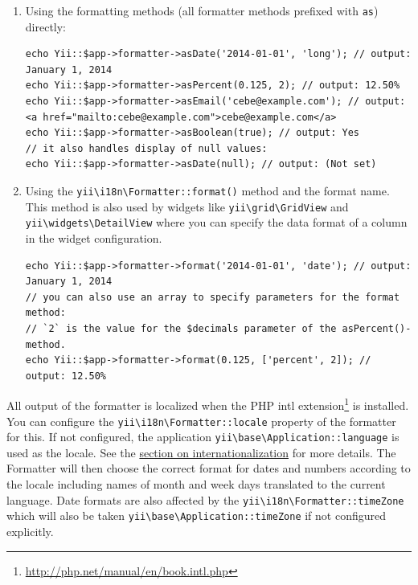 \begin{enumerate}
\item Using the formatting methods (all formatter methods prefixed with \lstinline|as|) directly:

\lstset{language=php}\begin{lstlisting}
echo Yii::$app->formatter->asDate('2014-01-01', 'long'); // output: January 1, 2014
echo Yii::$app->formatter->asPercent(0.125, 2); // output: 12.50%
echo Yii::$app->formatter->asEmail('cebe@example.com'); // output: <a href="mailto:cebe@example.com">cebe@example.com</a>
echo Yii::$app->formatter->asBoolean(true); // output: Yes
// it also handles display of null values:
echo Yii::$app->formatter->asDate(null); // output: (Not set)
\end{lstlisting}

\item Using the \texttt{yii{\allowbreak{}\textbackslash}i18n{\allowbreak{}\textbackslash}Formatter\allowbreak{}::\allowbreak{}format()} method and the format name.
This method is also used by widgets like \texttt{yii{\allowbreak{}\textbackslash}grid{\allowbreak{}\textbackslash}GridView} and \texttt{yii{\allowbreak{}\textbackslash}widgets{\allowbreak{}\textbackslash}DetailView} where you can specify
the data format of a column in the widget configuration.

\lstset{language=php}\begin{lstlisting}
echo Yii::$app->formatter->format('2014-01-01', 'date'); // output: January 1, 2014
// you can also use an array to specify parameters for the format method:
// `2` is the value for the $decimals parameter of the asPercent()-method.
echo Yii::$app->formatter->format(0.125, ['percent', 2]); // output: 12.50%
\end{lstlisting}

\end{enumerate}
All output of the formatter is localized when the PHP intl extension\footnote{\url{http://php.net/manual/en/book.intl.php}} is installed.
You can configure the \texttt{yii{\allowbreak{}\textbackslash}i18n{\allowbreak{}\textbackslash}Formatter\allowbreak{}::\allowbreak{}locale} property of the formatter for this. If not configured, the
application \texttt{yii{\allowbreak{}\textbackslash}base{\allowbreak{}\textbackslash}Application\allowbreak{}::\allowbreak{}language} is used as the locale. See the \hyperref[tutorial-i18n.md]{section on internationalization} for more details.
The Formatter will then choose the correct format for dates and numbers according to the locale including names of month and
week days translated to the current language. Date formats are also affected by the \texttt{yii{\allowbreak{}\textbackslash}i18n{\allowbreak{}\textbackslash}Formatter\allowbreak{}::\allowbreak{}timeZone}
which will also be taken \texttt{yii{\allowbreak{}\textbackslash}base{\allowbreak{}\textbackslash}Application\allowbreak{}::\allowbreak{}timeZone} if not configured explicitly.

